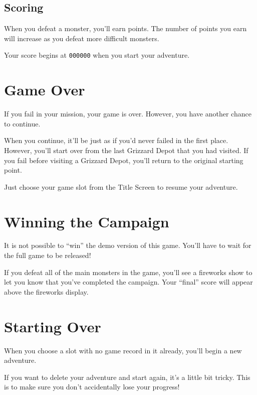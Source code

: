 \documentclass[10pt,twocolumn,openany,article]{memoir}
\begin{document}
\begin{description}
\subsection{Scoring}

When you  defeat a monster, you'll  earn points. The number  of points
you earn will increase as you defeat more difficult monsters.

Your score begins at \texttt{000000} when you start your adventure.

\section{Game Over}

If  you fail  in your  mission,  your game  is over.  However, you  have
another chance to continue.

When you continue, it'll  be just as if you'd never  failed in the first
place. However, you'll start over from  the last Grizzard Depot that you
had visited. If you fail before visiting a Grizzard Depot, you'll return
to the original starting point.

Just  choose   your  game   slot  from  the   Title  Screen   to  resume
your adventure.

\section{Winning the Campaign}\label{Winning the Campaign}

\ifdefined\DEMO

It is not possible to ``win'' the demo version of this game. You'll have
to wait for the full game to be released!

\else

If  you  defeat  all of  the  main  monsters  in  the game,  you'll  see
a fireworks  show to let  you know  that you've completed  the campaign.
Your ``final'' score will appear above the fireworks display.

\fi

\section{Starting Over}\label{Starting Your Adventure Over}

When you choose a  slot with no game record in  it already, you'll begin
a new adventure.

If you want to delete your adventure  and start again, it's a little bit
tricky. This is to make sure you don't accidentally lose your progress!


\end{description}
\end{document}
